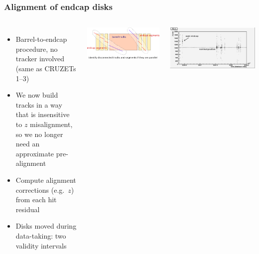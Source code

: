 \documentclass[compress]{beamer}
\begin{document}
\begin{frame}
\frametitle{Alignment of endcap disks}
\small

\begin{columns}
\begin{itemize}\setlength{\itemsep}{0.2 cm}
\item Barrel-to-endcap procedure, no tracker involved (same as CRUZETs 1--3)
\item We now build tracks in a way that is insensitive to $z$ misalignment,
  so we no longer need an approximate \mbox{pre-alignment\hspace{-0.5 cm}}
\item Compute alignment corrections (e.g.\ $z$) from each hit residual
\item Disks moved during data-taking: two validity intervals
\end{itemize}


\begin{center}
\includegraphics[width=\linewidth]{identify_if_parallel.png}
\end{center}

\vfill
\begin{center}
\includegraphics[width=\linewidth]{timeseries_YEp3.png}
\end{center}

\end{columns}
\end{frame}
\end{document}
